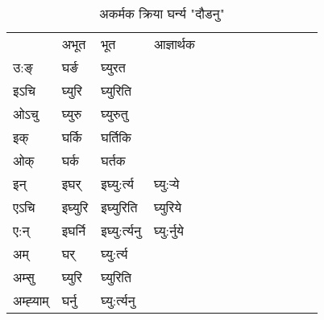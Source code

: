 \begin{table}[H]
\centering
\caption{\label{ur.vi} अकर्मक क्रिया  घर्न्य  "दौडनु"  }
\begin{tabular}{l|l|l|l|l|l|l|l|l|l|l|l|l}  \toprule
&अभूत & भूत & आज्ञार्थक \\ 
उ:ङ्‌ &घर्ङ &घ्युरत \\ 
इऽचि &घ्युरि &घ्युरिति   \\ 
ओऽचु &घ्युरु &घ्युरुतु   \\ 
इक् &घर्कि &घर्तिकि   \\ 
ओक् &घर्क &घर्तक   \\ 
इन् & इघर् & इघ्यु:र्त्य &घ्यु:र्‍ये  \\ 
एऽचि & इघ्युरि & इघ्युरिति &घ्युरिये    \\ 
ए:न् & इघर्नि  & इघ्यु:र्त्यनु &घ्यु:र्नुये  \\ 
अम् & घर् & घ्यु:र्त्य   \\ 
अम्सु & घ्युरि & घ्युरिति   \\ 
अम्ह्‍याम् & घर्नु  & घ्यु:र्त्यनु \\ 
\bottomrule
\end{tabular}
\end{table}


